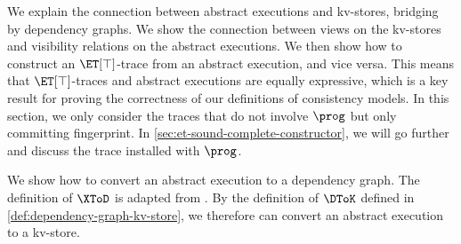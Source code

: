 We explain the connection between abstract executions and kv-stores,
bridging by dependency graphs.
We show the connection between views on the kv-stores
and visibility relations on the abstract executions.
We then show how to construct an \( \ET[\top] \)-trace from an abstract execution, and vice versa.
This means that \( \ET[\top] \)-traces and abstract executions are equally expressive,
which is a key result for proving the correctness of our definitions of consistency models.
In this section, we only consider the traces that do not involve \( \prog \) but only committing fingerprint.
In \cref{sec:et-sound-complete-constructor}, we will go further and discuss the trace installed with \( \prog \).


We show how to convert an abstract execution to a dependency graph.
The definition of \( \XToD \) is adapted from \citep{framework-concur,SIanalysis}.
By the definition of \( \DToK \) defined in \cref{def:dependency-graph-kv-store},
we therefore can convert an abstract execution to a kv-store.

